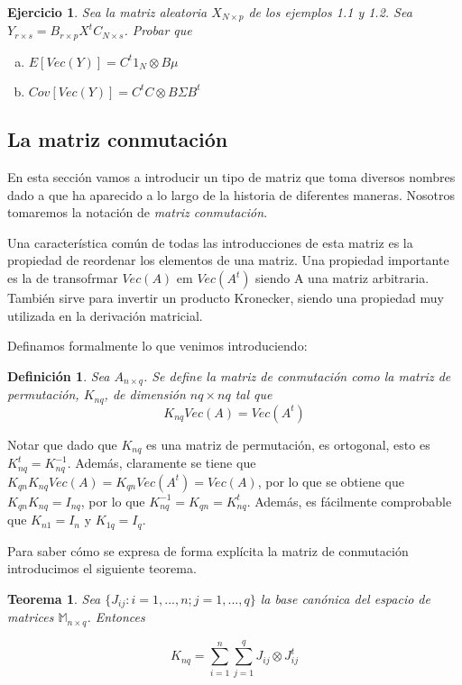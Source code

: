 \documentclass{article}
\theoremstyle{theorem-style}  %
\newtheorem{theorem}{Teorema}[section]  %
\theoremstyle{definition-style}
\newtheorem{definition}{Definición}[section]
\theoremstyle{example-style}
\theoremstyle{exercise-style}
\newtheorem{exercise}{Ejercicio}[section]
\begin{document}
	\begin{exercise}
		Sea la matriz aleatoria $X_{N \times p}$ de los ejemplos 1.1 y 1.2. Sea $Y_{r\times s} = B_{r\times p}X^tC_{N\times s}$. Probar que 
		\begin{enumerate}[a)]
			\item $E[Vec(Y)] = C^t1_N \otimes B\mu$
			\item $Cov[Vec(Y)] = C^tC \otimes B\Sigma B^t$
		\end{enumerate}
	\end{exercise}
	
	\subsection{La matriz conmutación}
	
	En esta sección vamos a introducir un tipo de matriz que toma diversos nombres dado a  que ha aparecido a lo largo de la historia de diferentes maneras. Nosotros tomaremos la notación de \textit{matriz conmutación}. 
	
	Una característica común de todas las introducciones de esta matriz es la propiedad de reordenar los 
	elementos de una matriz. Una propiedad importante es la de transofrmar $Vec(A)$ em $Vec(A^t)$ siendo A una matriz arbitraria. También sirve para invertir un producto Kronecker, siendo una propiedad muy utilizada en la derivación matricial.
	
	Definamos formalmente lo que venimos introduciendo:
	
	\begin{definition}	
		Sea $A_{n \times q}$. Se define la matriz de conmutación como la matriz de permutación, $K_{nq}$, de dimensión $nq \times nq$ tal que $$K_{nq}Vec(A) = Vec(A^t)$$
		
	\end{definition}
	
	
	Notar que dado que $K_{nq}$ es una matriz de permutación, es ortogonal, esto es $K_{nq}^t = K_{nq}^{-1}$. Además, claramente se tiene que $K_{qn}K_{nq} Vec(A) = K_{qn} Vec(A^t) = Vec(A)$, por lo que se obtiene que $K_{qn} K_{nq} = I_{nq}$, por lo que $K_{nq}^{-1} = K_{qn} = K_{nq}^t$. Además, es fácilmente comprobable que $K_{n1} = I_n$ y $K_{1q} = I_q$.
	
	Para saber cómo se expresa de forma explícita la matriz de conmutación introducimos el siguiente teorema.
	
	\begin{theorem}
		\textit{Sea $\{J_{ij}: i = 1, ..., n; j = 1,..., q\}$ la base canónica del espacio de matrices $\mathbb{M}_{n \times q}$. Entonces}
		
		$$K_{nq} = \sum_{i=1}^{n} \sum_{j=1}^{q} J_{ij} \otimes J_{ij}^t$$
	\end{theorem}
	
\end{document}
